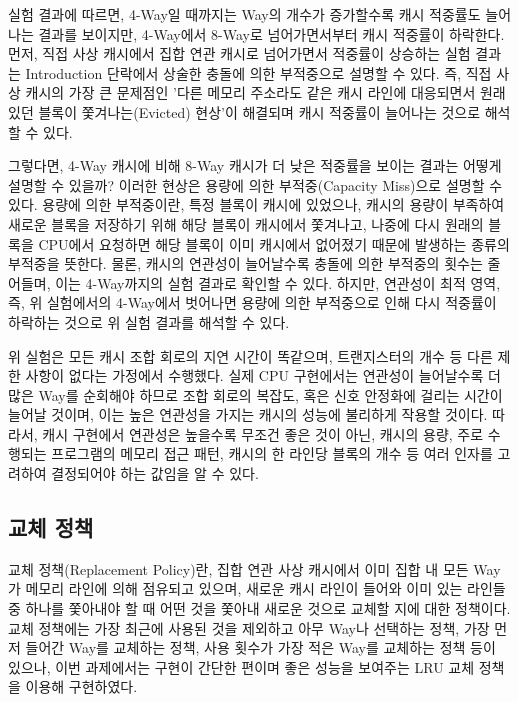 \documentclass[openright, a4paper]{article}
\begin{document}
\hfill

실험 결과에 따르면, 4-Way일 때까지는 Way의 개수가 증가할수록 캐시 적중률도 
늘어나는 결과를 보이지만, 4-Way에서 8-Way로 넘어가면서부터 캐시 적중률이 
하락한다. 먼저, 직접 사상 캐시에서 집합 연관 캐시로 넘어가면서 적중률이 상승하는
실험 결과는 Introduction 단락에서 상술한 충돌에 의한 부적중으로 설명할 수 있다. 
즉, 직접 사상 캐시의 가장 큰 문제점인 '다른 메모리 주소라도 같은 캐시 라인에 
대응되면서 원래 있던 블록이 쫓겨나는(Evicted) 현상'이 해결되며 캐시 적중률이 
늘어나는 것으로 해석할 수 있다.

그렇다면, 4-Way 캐시에 비해 8-Way 캐시가 더 낮은 적중률을 보이는 결과는 어떻게
설명할 수 있을까? 이러한 현상은 용량에 의한 부적중(Capacity Miss)으로 설명할 수 
있다. 용량에 의한 부적중이란, 특정 블록이 캐시에 있었으나, 캐시의 용량이 부족하여
새로운 블록을 저장하기 위해 해당 블록이 캐시에서 쫓겨나고, 나중에 다시
원래의 블록을 CPU에서 요청하면 해당 블록이 이미 캐시에서 없어졌기 때문에 발생하는
종류의 부적중을 뜻한다. 물론, 캐시의 연관성이 늘어날수록 충돌에 의한 부적중의 
횟수는 줄어들며, 이는 4-Way까지의 실험 결과로 확인할 수 있다. 하지만, 연관성이 
최적 영역, 즉, 위 실험에서의 4-Way에서 벗어나면 용량에 의한 부적중으로 인해 다시 
적중률이 하락하는 것으로 위 실험 결과를 해석할 수 있다. 

위 실험은 모든 캐시 조합 회로의 지연 시간이 똑같으며, 트랜지스터의 개수 등 다른
제한 사항이 없다는 가정에서 수행했다. 실제 CPU 구현에서는 연관성이 늘어날수록
더 많은 Way를 순회해야 하므로 조합 회로의 복잡도, 혹은 신호 안정화에 걸리는
시간이 늘어날 것이며, 이는 높은 연관성을 가지는 캐시의 성능에 불리하게 작용할 
것이다. 따라서, 캐시 구현에서 연관성은 높을수록 무조건 좋은 것이 아닌, 캐시의 
용량, 주로 수행되는 프로그램의 메모리 접근 패턴, 캐시의 한 라인당 블록의 개수 등
여러 인자를 고려하여 결정되어야 하는 값임을 알 수 있다.

\hfill

\subsection{교체 정책}

\hfill

교체 정책(Replacement Policy)란, 집합 연관 사상 캐시에서 이미 집합 내 모든 Way가
메모리 라인에 의해 점유되고 있으며, 새로운 캐시 라인이 들어와 이미 있는 라인들
중 하나를 쫓아내야 할 때 어떤 것을 쫓아내 새로운 것으로 교체할 지에 대한 
정책이다. 교체 정책에는 가장 최근에 사용된 것을 제외하고 아무 Way나 선택하는 
정책, 가장 먼저 들어간 Way를 교체하는 정책, 사용 횟수가 가장 적은 Way를 교체하는
정책 등이 있으나, 이번 과제에서는 구현이 간단한 편이며 좋은 성능을 보여주는
LRU 교체 정책을 이용해 구현하였다.
\end{document}
